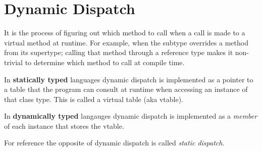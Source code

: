 \section{Dynamic Dispatch}
It is the process of figuring out which method to call when a call is
made to a virtual method at runtime. For example, when the subtype
overrides a method from its supertype; calling that method through a
reference type makes it non-trivial to determine which method to call at
compile time.

In \textbf{statically typed} languages dynamic dispatch is implemented
as a pointer to a table that the program can consult at runtime when
accessing an instance of that class type. This is called a virtual table
(aka vtable).

In \textbf{dynamically typed} langauges dynamic dispatch is implemented
as a \textit{member} of each instance that stores the vtable.

For reference the opposite of dynamic dispatch is called \textit{static
dispatch}.